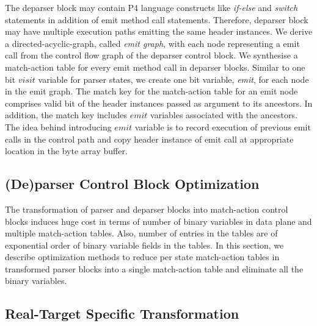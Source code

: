The deparser block may contain P4 language constructs like \emph{if-else} and \emph{switch} statements in addition of emit method call statements.
Therefore, deparser block may have multiple execution paths emitting the same header instances. 
We derive a directed-acyclic-graph, called \emph{emit graph}, with each node representing a emit call from the control flow graph of the deparser control block.
We synthesise a match-action table for every emit method call in deparser blocks.
Similar to one bit $visit$ variable for parser states, we create one bit variable, \emph{emit}, for each node in the emit graph.
The match key for the match-action table for an emit node comprises valid bit of the header instances passed as argument to its ancestors.
In addition, the match key includes $emit$ variables associated with the ancestors.
The idea behind introducing $emit$ variable is to record execution of previous emit calls in the control path and copy header instance  of emit call at appropriate location in the byte array buffer.



\subsection{(De)parser Control Block Optimization}
The transformation of parser and deparser blocks into match-action control blocks induces huge cost in terms of number of binary variables in data plane and multiple match-action tables.
Also, number of entries in the tables are of exponential order of binary variable fields in the tables.
In this section, we describe optimization methods to reduce per state match-action tables in transformed parser blocks into a single match-action table and eliminate all the binary variables.
 

\subsection{Real-Target Specific Transformation}

